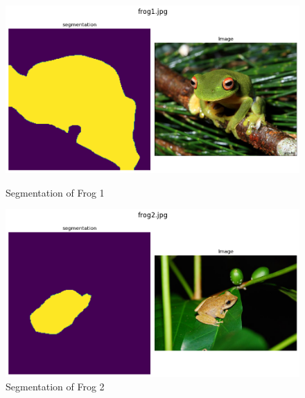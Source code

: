 \documentclass{article}
\begin{document}
\begin{figure}[h!]
    \centering
    \begin{minipage}{0.45\textwidth}
        \centering
        \includegraphics[width=\textwidth]{../output/1.2_rn1.png}
        \caption{Segmentation of Frog 1}
        \label{fig:1_2_resnet1}
    \end{minipage}
    \hfill
    \begin{minipage}{0.45\textwidth}
        \centering
        \includegraphics[width=\textwidth]{../output/1.2_rn2.png}
        \caption{Segmentation of Frog 2}
        \label{fig:1_2_resnet2}
    \end{minipage}
\end{figure}
\end{document}
